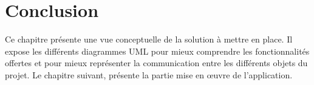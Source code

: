 \section{Conclusion}

Ce chapitre présente une vue conceptuelle de la solution à mettre en place. Il expose les différents diagrammes UML pour mieux comprendre les fonctionnalités offertes et pour mieux représenter la communication entre les différents objets du projet. Le chapitre suivant, présente la partie mise en œuvre de l’application.


